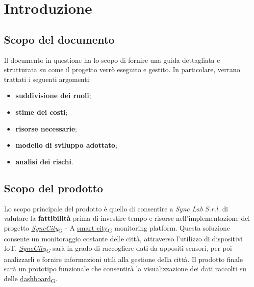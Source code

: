 \section{Introduzione}
\setcounter{subsection}{0}
\subsection{Scopo del documento}
Il documento in questione ha lo scopo di fornire una guida dettagliata e strutturata su come il progetto verrò eseguito e gestito. In particolare, verrano trattati i seguenti argomenti:
\begin{itemize}
	\item \textbf{suddivisione dei ruoli};
	\item \textbf{stime dei costi};
	\item \textbf{risorse necessarie};
	\item \textbf{modello di sviluppo adottato};
	\item \textbf{analisi dei rischi}.
\end{itemize}

\subsection{Scopo del prodotto}
Lo scopo principale del prodotto è quello di consentire a \textit{Sync Lab S.r.l.} di valutare la \textbf{fattibilità} prima di investire tempo e risorse nell'implementazione del progetto
\href{https://7last.github.io/docs/rtb/documentazione-interna/glossario\#synccity}{\textit{SyncCity}\textsubscript{G}} - A \href{https://7last.github.io/docs/rtb/documentazione-interna/glossario\#smart-city}{smart city\textsubscript{G}} monitoring platform. Questa soluzione consente un monitoraggio costante delle città, attraverso l'utilizzo di dispositivi IoT. \href{https://7last.github.io/docs/rtb/documentazione-interna/glossario\#synccity}{\textit{SyncCity\textsubscript{G}}} sarà in grado di raccogliere dati da appositi sensori, per poi analizzarli e fornire informazioni utili alla gestione della città. Il prodotto finale sarà un prototipo funzionale che consentirà la visualizzazione dei dati raccolti su delle \href{https://7last.github.io/docs/rtb/documentazione-interna/glossario#dashboard}{dashboard\textsubscript{G}}.

